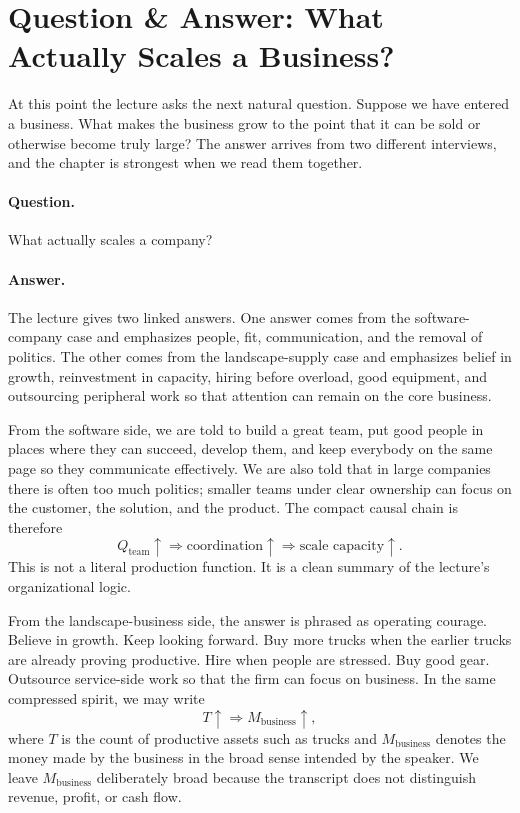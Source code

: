 \section{Question \& Answer: What Actually Scales a Business?}

At this point the lecture asks the next natural question. Suppose we have entered a business. What makes the business grow to the point that it can be sold or otherwise become truly large? The answer arrives from two different interviews, and the chapter is strongest when we read them together.

\paragraph{Question.} What actually scales a company?

\paragraph{Answer.} The lecture gives two linked answers. One answer comes from the software-company case and emphasizes people, fit, communication, and the removal of politics. The other comes from the landscape-supply case and emphasizes belief in growth, reinvestment in capacity, hiring before overload, good equipment, and outsourcing peripheral work so that attention can remain on the core business.

From the software side, we are told to build a great team, put good people in places where they can succeed, develop them, and keep everybody on the same page so they communicate effectively. We are also told that in large companies there is often too much politics; smaller teams under clear ownership can focus on the customer, the solution, and the product. The compact causal chain is therefore
\begin{equation}
Q_{\text{team}} \uparrow
\Rightarrow
\text{coordination} \uparrow
\Rightarrow
\text{scale capacity} \uparrow.
\end{equation}
This is not a literal production function. It is a clean summary of the lecture's organizational logic.

From the landscape-business side, the answer is phrased as operating courage. Believe in growth. Keep looking forward. Buy more trucks when the earlier trucks are already proving productive. Hire when people are stressed. Buy good gear. Outsource service-side work so that the firm can focus on business. In the same compressed spirit, we may write
\begin{equation}
T \uparrow \Rightarrow M_{\text{business}} \uparrow,
\end{equation}
where \(T\) is the count of productive assets such as trucks and \(M_{\text{business}}\) denotes the money made by the business in the broad sense intended by the speaker. We leave \(M_{\text{business}}\) deliberately broad because the transcript does not distinguish revenue, profit, or cash flow.

